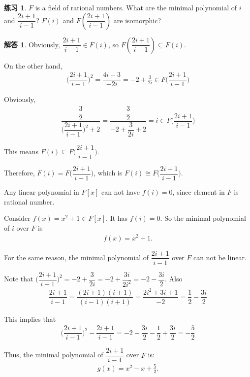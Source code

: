 \documentclass[utf8]{ctexbook}
\theoremstyle{definition}
\newtheorem{exercise}{练习}[section]
\newtheorem*{soln}{解答}
\begin{document}
\begin{exercise}
$F$ is a field of rational numbers. What are the minimal polynomial of $i$ and $\dfrac{2i + 1}{i - 1}$? $F(i)$ and $F( \dfrac{2i + 1}{i - 1})$ are isomorphic?
\end{exercise}

\begin{soln}
Obviously, $\dfrac{2i + 1}{i - 1} \in F(i)$, so $F(\dfrac{2i + 1}{i - 1}) \subseteq F(i)$.

On the other hand,
\begin{align*}
\big( \dfrac{2i + 1}{i - 1}  \big)^2 = \dfrac{4i - 3}{-2i} = -2 + \frac{3}{2 i} \in F \big( \dfrac{2i + 1}{i - 1} \big)
\end{align*}

Obviously,
\begin{align*}
\dfrac{\dfrac{3}{2}}{\big( \dfrac{2i + 1}{i - 1}  \big)^2  + 2} = \dfrac{\dfrac{3}{2}}{ -2 + \dfrac{3}{2 i}  + 2} = i \in F \big( \dfrac{2i + 1}{i - 1} \big)
\end{align*}

This means $F(i) \subseteq F \big( \dfrac{2i + 1}{i - 1} \big)$.

Therefore, $F(i) = F \big( \dfrac{2i + 1}{i - 1} \big)$, which is $F(i) \cong F \big( \dfrac{2i + 1}{i - 1} \big)$.

Any linear polynomial in $F[x]$ can not have $f(i) =0$, since element in $F$ is rational number.

Consider $f(x)= x^2 + 1 \in F[x]$. It has $f(i) = 0$. So the minimal polynomial of $i$ over $F$ is 
\begin{align*}
f(x) = x^2 + 1.
\end{align*}

For the same reason, the minimal polynomial of $ \dfrac{2i + 1}{i - 1} $ over $F$ can not be linear.

Note that $ \big( \dfrac{2i + 1}{i - 1}  \big)^2 = -2 + \dfrac{3}{2 i} = -2 + \dfrac{3i}{2 i^2 } = -2 - \dfrac{3 i }{2} $. Also
\begin{align*}
\dfrac{2i + 1}{i - 1} = \dfrac{(2i + 1) (i + 1 )}{(i - 1) (i+1)} = \dfrac{ 2i^2 + 3i+ 1  }{- 2}  = \dfrac{1}{2} - \dfrac{3i}{2} 
\end{align*}

This implies that
\begin{align*}
\big( \dfrac{2i + 1}{i - 1}  \big)^2 - \dfrac{2i + 1}{i - 1} = -2 - \dfrac{3 i }{2} - \dfrac{1}{2} + \dfrac{3 i}{2}  = - \dfrac{5}{2}
\end{align*}

Thus, the minimal polynomial of $\dfrac{2i + 1}{i - 1}$ over $F$ is:
\begin{align*}
g(x) = x^2 - x + \frac{5}{2} .
\end{align*}

\end{soln}
\end{document}
